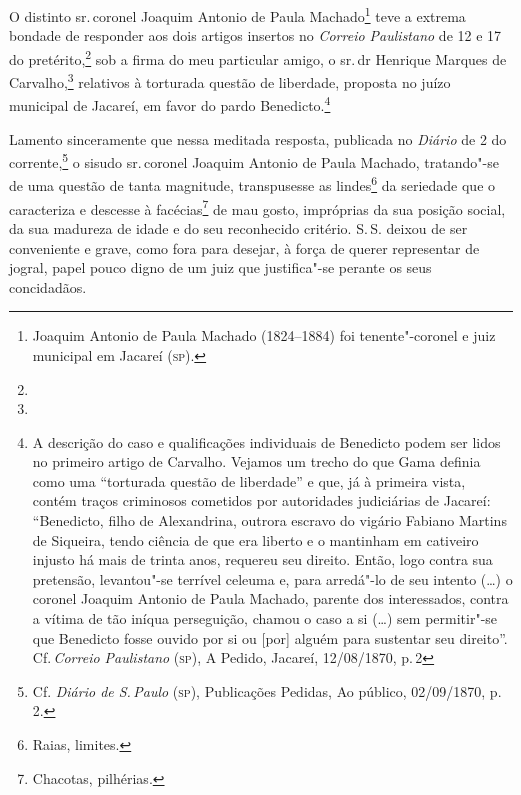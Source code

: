 \noindent{}O distinto sr.\,coronel Joaquim Antonio de Paula Machado\footnote{
  Joaquim Antonio de Paula Machado (1824--1884) foi tenente"-coronel e
  juiz municipal em Jacareí (\textsc{sp}).} teve a extrema bondade de responder
aos dois artigos insertos no \emph{Correio Paulistano} de 12 e 17 do
pretérito,\footnote{} sob a firma do meu
particular amigo, o sr.\,dr Henrique Marques de Carvalho,\footnote{} relativos à torturada questão de liberdade, proposta no
juízo municipal de Jacareí, em favor do pardo Benedicto.\footnote{A
  descrição do caso e qualificações individuais de Benedicto podem ser
  lidos no primeiro artigo de Carvalho. Vejamos um trecho do que Gama
  definia como uma ``torturada questão de liberdade'' e que, já à primeira
  vista, contém traços criminosos cometidos por autoridades judiciárias
  de Jacareí: ``Benedicto, filho de Alexandrina, outrora escravo do
  vigário Fabiano Martins de Siqueira, tendo ciência de que era liberto
  e o mantinham em cativeiro injusto há mais de trinta anos, requereu
  seu direito. Então, logo contra sua pretensão, levantou"-se terrível
  celeuma e, para arredá"-lo de seu intento (\ldots{}) o coronel Joaquim
  Antonio de Paula Machado, parente dos interessados, contra a vítima de
  tão iníqua perseguição, chamou o caso a si (\ldots{}) sem permitir"-se que
  Benedicto fosse ouvido por si ou {[}por{]} alguém para sustentar seu
  direito''. Cf.\,\emph{Correio Paulistano} (\textsc{sp}), A Pedido, Jacareí,
  12/08/1870, p.\,2}

Lamento sinceramente que nessa meditada resposta, publicada no
\emph{Diário} de 2 do corrente,\footnote{Cf. \emph{Diário de S.\,Paulo}
  (\textsc{sp}), Publicações Pedidas, Ao público, 02/09/1870, p. 2.} o sisudo sr.\,coronel Joaquim Antonio de Paula Machado, tratando"-se de uma questão de
tanta magnitude, transpusesse as lindes\footnote{Raias, limites.} da
seriedade que o caracteriza e descesse à facécias\footnote{Chacotas,
  pilhérias.} de mau gosto, impróprias da sua posição social, da sua
madureza de idade e do seu reconhecido critério. S.\,S. deixou de ser
conveniente e grave, como fora para desejar, à força de querer
representar de jogral, papel pouco digno de um juiz que justifica"-se
perante os seus concidadãos.

